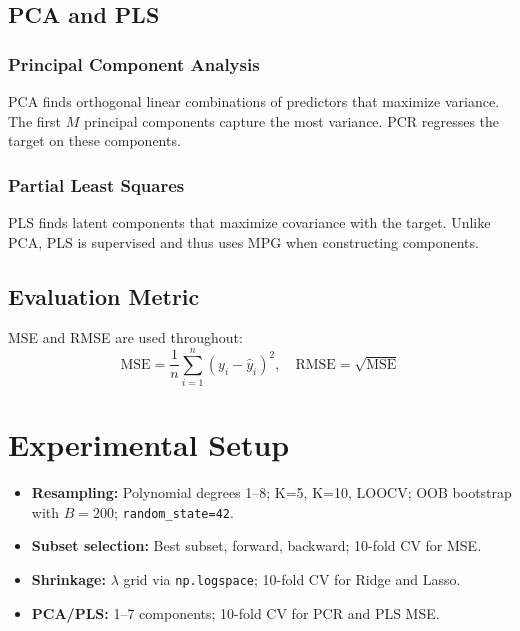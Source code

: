 \documentclass[conference]{IEEEtran}
\begin{document}
\subsection{PCA and PLS}
\label{sec:pca}

\subsubsection{Principal Component Analysis}
PCA finds orthogonal linear combinations of predictors that maximize variance. The first $M$ principal components capture the most variance. PCR regresses the target on these components.

\subsubsection{Partial Least Squares}
PLS finds latent components that maximize covariance with the target. Unlike PCA, PLS is supervised and thus uses MPG when constructing components.

\subsection{Evaluation Metric}
MSE and RMSE are used throughout:
\begin{equation}
\text{MSE} = \frac{1}{n}\sum_{i=1}^{n}(y_i - \hat{y}_i)^2, \quad \text{RMSE} = \sqrt{\text{MSE}}
\end{equation}

\section{Experimental Setup}
\label{sec:experiments}

\begin{itemize}
    \item \textbf{Resampling:} Polynomial degrees 1--8; K=5, K=10, LOOCV; OOB bootstrap with $B=200$; \texttt{random\_state=42}.
    \item \textbf{Subset selection:} Best subset, forward, backward; 10-fold CV for MSE.
    \item \textbf{Shrinkage:} $\lambda$ grid via \texttt{np.logspace}; 10-fold CV for Ridge and Lasso.
    \item \textbf{PCA/PLS:} 1--7 components; 10-fold CV for PCR and PLS MSE.
\end{itemize}
\end{document}
